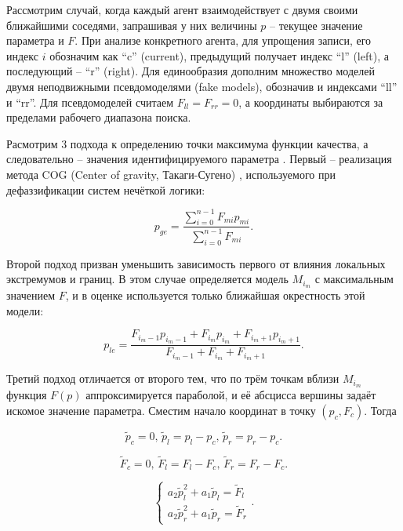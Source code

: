 \documentclass[a4paper,paratype,12pt,fouriernc]{cmonogra}
\begin{document}
Рассмотрим случай, когда каждый агент взаимодействует с двумя своими ближайшими соседями,
запрашивая у них величины $p$ -- текущее значение параметра и $F$.
При анализе конкретного агента, для упрощения записи, его индекс $i$ обозначим как ``c'' (current),
предыдущий получает индекс ``l'' (left), а последующий -- ``r'' (right).
Для единообразия дополним множество моделей двумя неподвижными псевдомоделями (fake models),
обозначив и индексами ``ll'' и ``rr''. Для псевдомоделей считаем $  F_{ll} = F_{rr} = 0$,
а координаты выбираются за пределами рабочего диапазона поиска.


Расмотрим 3 подхода к определению
точки максимума функции качества, а следовательно -- значения идентифицируемого параметра \cite{atu_st99}.
Первый -- реализация
метода COG (Center of gravity, Такаги-Сугено) \cite{atu_asau25},
используемого при дефаззификации систем нечёткой логики:

\begin{equation}
  p_{ge}
  =
  \frac{\sum\limits_{i=0}^{n-1} F_{mi} p_{mi}}
       {\sum\limits_{i=0}^{n-1} F_{mi} }
  .
  \label{atu:eq:p_ge}
\end{equation}

Второй подход призван уменьшить зависимость первого
от влияния локальных экстремумов и границ. В этом
случае определяется модель $M_{i_{m}}$ с максимальным значением
$F$, и в оценке используется только ближайшая окрестность этой модели:

\begin{equation}
  p_{le}
  =
  \frac{ F_{i_m-1} p_{i_m-1} + F_{i_m} p_{i_m} + F_{i_m+1} p_{i_m+1} }
       { F_{i_m-1} + F_{i_m} + F_{i_m+1} }
  .
  \label{atu:eq:p_le}
\end{equation}

Третий подход отличается от второго тем, что по трём точкам вблизи  $M_{i_{m}}$
функция $F(p)$ аппроксимируется параболой, и её абсцисса вершины задаёт искомое
значение параметра. Сместим начало координат в точку
$ ( p_c, F_c ) $. Тогда

\[
  \tilde{p}_c = 0, \,
  \tilde{p}_l = p_l - p_c, \,
  \tilde{p}_r = p_r - p_c.
\]

\[
  \tilde{F}_c = 0, \,
  \tilde{F}_l = F_l - F_c, \,
  \tilde{F}_r = F_r - F_c.
\]

\[
  \left\{
    \begin{array}{l}
      a_2 \tilde{p}_l^2 + a_1 \tilde{p}_l  = \tilde{F}_l
      \\
      a_2 \tilde{p}_r^2 + a_1 \tilde{p}_r  = \tilde{F}_r
    \end{array}
  \right. .
\]
\end{document}
